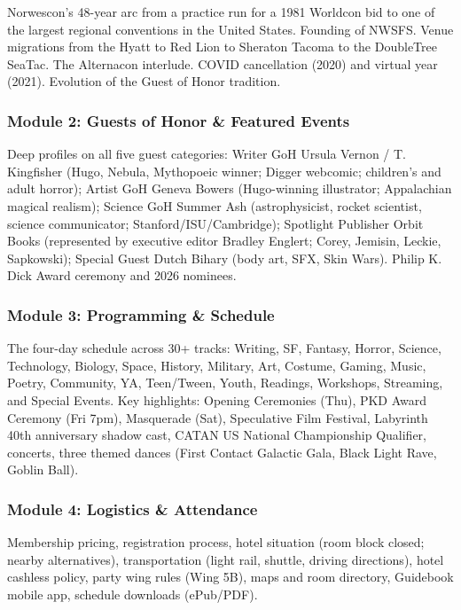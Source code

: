 \documentclass[11pt,letterpaper]{article}
\begin{document}
Norwescon's 48-year arc from a practice run for a 1981 Worldcon bid to one of the largest regional conventions in the United States. Founding of NWSFS. Venue migrations from the Hyatt to Red Lion to Sheraton Tacoma to the DoubleTree SeaTac. The Alternacon interlude. COVID cancellation (2020) and virtual year (2021). Evolution of the Guest of Honor tradition.

\subsubsection{Module 2: Guests of Honor \& Featured Events}

Deep profiles on all five guest categories: Writer GoH Ursula Vernon / T. Kingfisher (Hugo, Nebula, Mythopoeic winner; Digger webcomic; children's and adult horror); Artist GoH Geneva Bowers (Hugo-winning illustrator; Appalachian magical realism); Science GoH Summer Ash (astrophysicist, rocket scientist, science communicator; Stanford/ISU/Cambridge); Spotlight Publisher Orbit Books (represented by executive editor Bradley Englert; Corey, Jemisin, Leckie, Sapkowski); Special Guest Dutch Bihary (body art, SFX, Skin Wars). Philip K. Dick Award ceremony and 2026 nominees.

\subsubsection{Module 3: Programming \& Schedule}

The four-day schedule across 30+ tracks: Writing, SF, Fantasy, Horror, Science, Technology, Biology, Space, History, Military, Art, Costume, Gaming, Music, Poetry, Community, YA, Teen/Tween, Youth, Readings, Workshops, Streaming, and Special Events. Key highlights: Opening Ceremonies (Thu), PKD Award Ceremony (Fri 7pm), Masquerade (Sat), Speculative Film Festival, Labyrinth 40th anniversary shadow cast, CATAN US National Championship Qualifier, concerts, three themed dances (First Contact Galactic Gala, Black Light Rave, Goblin Ball).

\subsubsection{Module 4: Logistics \& Attendance}

Membership pricing, registration process, hotel situation (room block closed; nearby alternatives), transportation (light rail, shuttle, driving directions), hotel cashless policy, party wing rules (Wing 5B), maps and room directory, Guidebook mobile app, schedule downloads (ePub/PDF).
\end{document}
